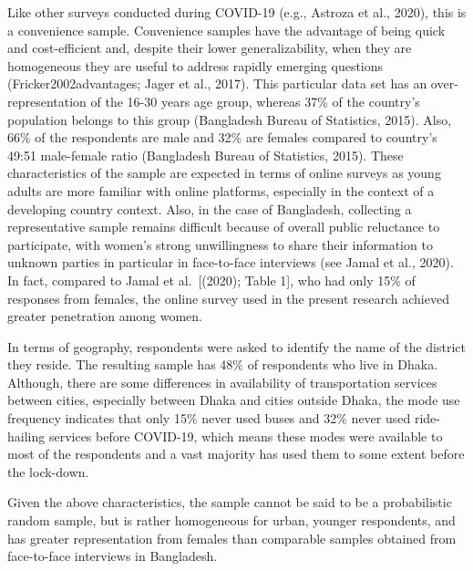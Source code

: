 \documentclass[]{elsarticle} %
\begin{document}
Like other surveys conducted during COVID-19 (e.g., Astroza et al.,
2020), this is a convenience sample. Convenience samples have the
advantage of being quick and cost-efficient and, despite their lower
generalizability, when they are homogeneous they are useful to address
rapidly emerging questions (Fricker2002advantages; Jager et al., 2017).
This particular data set has an over-representation of the 16-30 years
age group, whereas 37\% of the country's population belongs to this
group (Bangladesh Bureau of Statistics, 2015). Also, 66\% of the
respondents are male and 32\% are females compared to country's 49:51
male-female ratio (Bangladesh Bureau of Statistics, 2015). These
characteristics of the sample are expected in terms of online surveys as
young adults are more familiar with online platforms, especially in the
context of a developing country context. Also, in the case of
Bangladesh, collecting a representative sample remains difficult because
of overall public reluctance to participate, with women's strong
unwillingness to share their information to unknown parties in
particular in face-to-face interviews (see Jamal et al., 2020). In fact,
compared to Jamal et al.~{[}(2020); Table 1{]}, who had only 15\% of
responses from females, the online survey used in the present research
achieved greater penetration among women.

In terms of geography, respondents were asked to identify the name of
the district they reside. The resulting sample has 48\% of respondents
who live in Dhaka. Although, there are some differences in availability
of transportation services between cities, especially between Dhaka and
cities outside Dhaka, the mode use frequency indicates that only 15\%
never used buses and 32\% never used ride-hailing services before
COVID-19, which means these modes were available to most of the
respondents and a vast majority has used them to some extent before the
lock-down.

Given the above characteristics, the sample cannot be said to be a
probabilistic random sample, but is rather homogeneous for urban,
younger respondents, and has greater representation from females than
comparable samples obtained from face-to-face interviews in Bangladesh.
\end{document}
